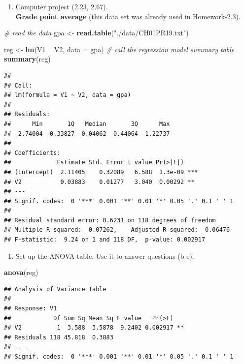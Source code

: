 \documentclass[
]{article}
\newenvironment{Shaded}{\begin{snugshade}}{\end{snugshade}}
\newcommand{\CommentTok}[1]{\textcolor[rgb]{0.56,0.35,0.01}{\textit{#1}}}
\newcommand{\DataTypeTok}[1]{\textcolor[rgb]{0.13,0.29,0.53}{#1}}
\newcommand{\KeywordTok}[1]{\textcolor[rgb]{0.13,0.29,0.53}{\textbf{#1}}}
\newcommand{\NormalTok}[1]{#1}
\newcommand{\OperatorTok}[1]{\textcolor[rgb]{0.81,0.36,0.00}{\textbf{#1}}}
\newcommand{\StringTok}[1]{\textcolor[rgb]{0.31,0.60,0.02}{#1}}
\providecommand{\tightlist}{%
  \setlength{\itemsep}{0pt}\setlength{\parskip}{0pt}}
\begin{document}
\begin{enumerate}
\def\labelenumi{\arabic{enumi}.}
\setcounter{enumi}{5}
\tightlist
\item
  Computer project (2.23, 2.67).\\
  \textbf{Grade point average} (this data set was already used in
  Homework-2,3).
\end{enumerate}

\begin{Shaded}
\begin{Highlighting}[]
\CommentTok{# read the data}
\NormalTok{gpa <-}\StringTok{ }\KeywordTok{read.table}\NormalTok{(}\StringTok{"./data/CH01PR19.txt"}\NormalTok{)}

\NormalTok{reg <-}\StringTok{ }\KeywordTok{lm}\NormalTok{(V1 }\OperatorTok{~}\StringTok{ }\NormalTok{V2, }\DataTypeTok{data =}\NormalTok{ gpa)}
\CommentTok{# call the regression model summary table}
\KeywordTok{summary}\NormalTok{(reg)}
\end{Highlighting}
\end{Shaded}

\begin{verbatim}
## 
## Call:
## lm(formula = V1 ~ V2, data = gpa)
## 
## Residuals:
##      Min       1Q   Median       3Q      Max 
## -2.74004 -0.33827  0.04062  0.44064  1.22737 
## 
## Coefficients:
##             Estimate Std. Error t value Pr(>|t|)    
## (Intercept)  2.11405    0.32089   6.588  1.3e-09 ***
## V2           0.03883    0.01277   3.040  0.00292 ** 
## ---
## Signif. codes:  0 '***' 0.001 '**' 0.01 '*' 0.05 '.' 0.1 ' ' 1
## 
## Residual standard error: 0.6231 on 118 degrees of freedom
## Multiple R-squared:  0.07262,    Adjusted R-squared:  0.06476 
## F-statistic:  9.24 on 1 and 118 DF,  p-value: 0.002917
\end{verbatim}

\begin{enumerate}
\def\labelenumi{(\alph{enumi})}
\tightlist
\item
  Set up the ANOVA table. Use it to answer questions (b-e).
\end{enumerate}

\begin{Shaded}
\begin{Highlighting}[]
\KeywordTok{anova}\NormalTok{(reg)}
\end{Highlighting}
\end{Shaded}

\begin{verbatim}
## Analysis of Variance Table
## 
## Response: V1
##            Df Sum Sq Mean Sq F value   Pr(>F)   
## V2          1  3.588  3.5878  9.2402 0.002917 **
## Residuals 118 45.818  0.3883                    
## ---
## Signif. codes:  0 '***' 0.001 '**' 0.01 '*' 0.05 '.' 0.1 ' ' 1
\end{verbatim}
\end{document}
